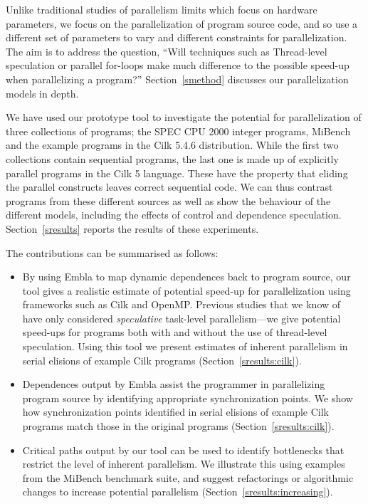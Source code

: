 Unlike traditional studies of parallelism limits \cite{wall91limits,warg01limits}
which focus on hardware parameters, we focus on the 
parallelization of program source code, and so use a
different set of parameters to vary and different constraints for
parallelization. The aim is to address the question,
``Will techniques such as
Thread-level speculation or parallel for-loops make much
difference to the possible speed-up when parallelizing
a program?'' Section~\ref{smethod} 
discusses our parallelization models in depth.

We have used our prototype tool to investigate the potential for 
parallelization of three collections of programs; the SPEC CPU 2000 
integer programs, MiBench and the example programs in
the Cilk 5.4.6 distribution. While the first two collections contain
sequential programs, the last one is made up of explicitly parallel 
programs in the Cilk 5 language. These have the property that eliding
the parallel constructs leaves correct sequential code.
We can thus contrast 
programs from these different sources as well as show the behaviour of 
the different models, including the effects of control and dependence speculation.
Section~\ref{sresults} reports the results of these experiments.

The contributions can be summarised as follows:
\begin{itemize}
\item
By using Embla to map dynamic dependences back to program source,
our tool gives a realistic estimate of potential speed-up for
parallelization using frameworks such as Cilk and OpenMP.
Previous studies that we know of~\cite{Kreaseck00limitsof,warg01limits,oplinger99insearch}
have only considered \emph{speculative}
task-level parallelism---we give potential speed-ups for programs
both with and without the use of thread-level speculation.
Using this tool we present estimates of inherent parallelism in
serial elisions of example Cilk programs (Section~\ref{sresults:cilk}).
\item
Dependences output by Embla assist the programmer in 
parallelizing program source by identifying
appropriate synchronization points. We show how synchronization
points identified in serial elisions of example Cilk programs
match those in the original programs (Section~\ref{sresults:cilk}).
\item
Critical paths output by our tool can
be used to identify bottlenecks that restrict the level of
inherent parallelism. We illustrate this using examples
from the MiBench benchmark suite, and suggest refactorings
or algorithmic changes to increase potential parallelism (Section~\ref{sresults:increasing}).
\end{itemize}
